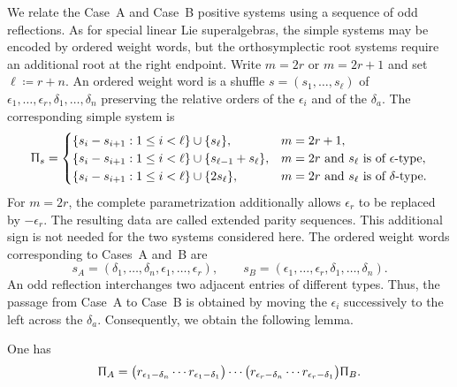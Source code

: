 We relate the Case~A and Case~B positive systems using a sequence of odd reflections. As for special linear Lie superalgebras, the simple systems may be encoded by ordered weight words, but the orthosymplectic root systems require an additional root at the right endpoint. Write $m=2r$ or $m=2r+1$ and set $\ell\coloneqq r+n$. An ordered weight word is a shuffle $s=(s_1,\ldots,s_\ell)$ of $\epsilon_1,\ldots,\epsilon_r,\delta_1,\ldots,\delta_n$ preserving the relative orders of the $\epsilon_i$ and of the $\delta_a$. The corresponding simple system is
\begin{equation}
\Uppi_s=
\begin{cases}
\{s_i-s_{i+1}:1\leq i<\ell\}\cup\{s_\ell\},
&m=2r+1,\\
\{s_i-s_{i+1}:1\leq i<\ell\}\cup\{s_{\ell-1}+s_\ell\},
&m=2r\text{ and }s_\ell\text{ is of }\epsilon\text{-type},\\
\{s_i-s_{i+1}:1\leq i<\ell\}\cup\{2s_\ell\},
&m=2r\text{ and }s_\ell\text{ is of }\delta\text{-type}.
\end{cases}
\label{eq:osp-weight-word}
\end{equation}
For $m=2r$, the complete parametrization additionally allows $\epsilon_r$ to be replaced by $-\epsilon_r$. The resulting data are called extended parity sequences. This additional sign is not needed for the two systems considered here. The ordered weight words corresponding to Cases~A and~B are
\begin{equation}
s_A=(\delta_1,\ldots,\delta_n,\epsilon_1,\ldots,\epsilon_r),
\qquad
s_B=(\epsilon_1,\ldots,\epsilon_r,\delta_1,\ldots,\delta_n).
\label{eq:osp-case-words}
\end{equation}
An odd reflection interchanges two adjacent entries of different types. Thus, the passage from Case~A to Case~B is obtained by moving the $\epsilon_i$ successively to the left across the $\delta_a$. Consequently, we obtain the following lemma.

\begin{lemma}\label{lemm::relating_A_and_B_simple_system} One has
\begin{equation*}
\Uppi_A
=
\bigl(r_{\epsilon_1-\delta_n}\cdots r_{\epsilon_1-\delta_1}\bigr)
\cdots
\bigl(r_{\epsilon_r-\delta_n}\cdots r_{\epsilon_r-\delta_1}\bigr)
\Uppi_B.
\end{equation*}
\end{lemma}

